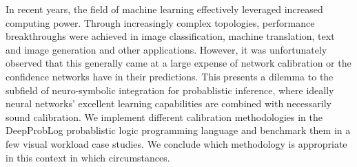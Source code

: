 In recent years, the field of machine learning effectively leveraged increased computing power. Through increasingly complex topologies, performance breakthroughs were achieved in image classification, machine translation, text and image generation and other applications. However, it was unfortunately observed that this generally came at a large expense of network calibration or the confidence networks have in their predictions. This presents a dilemma to the subfield of neuro-symbolic integration for probablistic inference, where ideally neural networks' excellent learning capabilities are combined with necessarily sound calibration. We implement different calibration methodologies in the DeepProbLog probablistic logic programming language and benchmark them in a few visual workload case studies. We conclude which methodology is appropriate in this context in which circumstances.